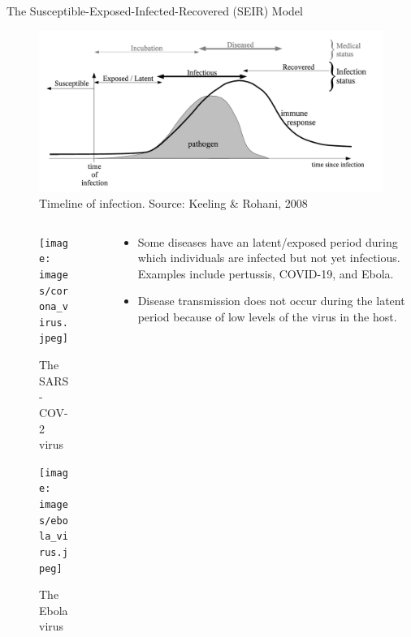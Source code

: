 \documentclass[
  ignorenonframetext,
]{beamer}
\providecommand{\tightlist}{%
  \setlength{\itemsep}{0pt}\setlength{\parskip}{0pt}}\usepackage{longtable,booktabs,array}
\begin{document}
\begin{frame}
\begin{block}{The Susceptible-Exposed-Infected-Recovered (SEIR) Model}
\label{the-susceptible-exposed-infected-recovered-seir-model}
\begin{figure}[H]

{\centering \includegraphics{images/infection_timeline.png}

}

\caption{Timeline of infection. Source: Keeling \& Rohani, 2008}

\end{figure}%
\end{block}
\end{frame}

\begin{frame}
\begin{columns}[T]
\begin{column}{0.3\textwidth}
\begin{figure}[H]

{\centering \texttt{[image: images/corona\_virus.jpeg]}

}

\caption{The SARS-COV-2 virus}

\end{figure}%
\begin{figure}[H]

{\centering \texttt{[image: images/ebola\_virus.jpeg]}

}

\caption{The Ebola virus}

\end{figure}%
\end{column}

\begin{column}{0.7\textwidth}
\begin{itemize}
\tightlist
\item
  Some diseases have an {latent/exposed period} during which individuals
  are {infected but not yet infectious}. Examples include pertussis,
  COVID-19, and Ebola.
\item
  Disease transmission does not occur during the latent period because
  of low levels of the virus in the host.
\end{itemize}
\end{column}
\end{columns}
\end{frame}
\end{document}
